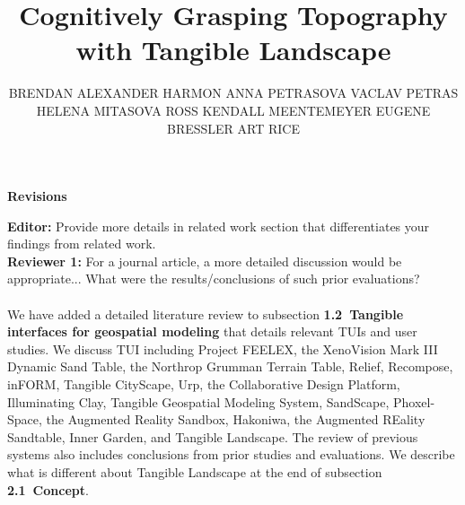 \documentclass[prodmode,acmtochi]{acmsmall} %
\begin{document}

\title{Cognitively Grasping Topography with Tangible Landscape}
\author{BRENDAN ALEXANDER HARMON
ANNA PETRASOVA
VACLAV PETRAS
HELENA MITASOVA
ROSS ​KENDALL MEENTEMEYER
EUGENE BRESSLER
ART RICE
}

\maketitle

\textbf{Revisions}

\vspace*{3em}

%
%

\textbf{Editor:} Provide more details in related work section 
that differentiates your findings from related work.\\

\textbf{Reviewer 1:} For a journal article, a more detailed discussion would be appropriate... What were the results/conclusions of such prior evaluations?\\

\hrulefill \\

We have added a detailed literature review to subsection 
\textbf{1.2~Tangible interfaces for geospatial modeling}
that details relevant TUIs and user studies.
We discuss TUI including 
Project FEELEX, 
the XenoVision Mark III Dynamic Sand Table,  
the Northrop Grumman Terrain Table, 
Relief, Recompose, inFORM, Tangible CityScape,
Urp, the Collaborative Design Platform, 
Illuminating Clay, Tangible Geospatial Modeling System, 
SandScape, Phoxel-Space, 
the Augmented Reality Sandbox,
Hakoniwa, the Augmented REality Sandtable,
Inner Garden, and Tangible Landscape. 
The review of previous systems also includes 
conclusions from prior studies and  evaluations.
We describe what is different about Tangible Landscape 
at the end of subsection \textbf{2.1~Concept}.\\
\end{document}
